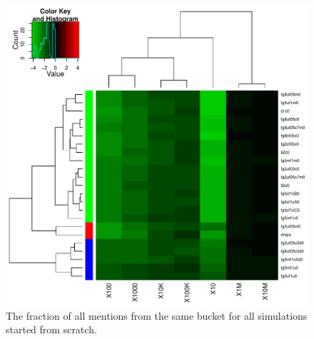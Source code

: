 \documentclass[10pt,oneside]{memoir}
\begin{document}
\begin{Spacing}{2}
\begin{figure}
\begin{center}
    \includegraphics{figures/crop/heatmap-b2bm-self-rel-medians-log10-0wk}
    \caption{The fraction of all mentions from the same bucket for all simulations started from scratch.}
    \label{figure:heatmap-b2bm-self-rel-medians-0wk}
\end{center}
\end{figure}


\end{Spacing}
\end{document}
